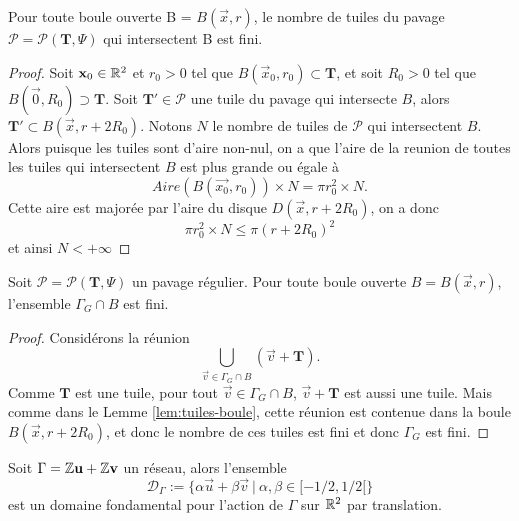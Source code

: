 \begin{lemma}
	\label{lem:tuiles-boule}
	Pour toute boule ouverte B = $B(\vec{x}, r)$, le nombre de tuiles
	du pavage $\mathcal{P} = \mathcal{P}(\mathbf{T}, \Psi)$ qui intersectent B est fini.
\end{lemma}
\begin{proof}
	Soit $\mathbf{x}_0 \in \mathbb{R}^2$ et $r_0 > 0$ tel que
	$B(\vec{x}_0, r_0) \subset \mathbf{T}$, et
	soit $R_0 > 0$ tel que $B(\vec{0}, R_0) \supset \mathbf{T}$.
	Soit $\mathbf{T}' \in \mathcal{P}$ une tuile du pavage qui intersecte $B$,
	alors $\mathbf{T}' \subset B(\vec{x}, r + 2R_0)$.
	Notons $N$ le nombre de tuiles de $\mathcal{P}$ qui intersectent $B$.
	Alors puisque les tuiles sont d'aire non-nul, on a que
	l'aire de la reunion de toutes les tuiles qui intersectent $B$
	est plus grande ou égale à
	\begin{equation*}
		Aire(B(\vec{x_0}, r_0)) \times N = \pi r_0^2 \times N.
	\end{equation*}
	Cette aire est majorée par l'aire du disque $D(\vec{x}, r + 2R_0)$,
	on a donc
	\begin{equation*}
		\pi r_0^2 \times N \leq \pi(r + 2R_0)^2
	\end{equation*}
	et ainsi $N < +\infty$
\end{proof}

\begin{lemma}
	\label{lem:translations-boule}
	Soit $\mathcal{P} = \mathcal{P}(\mathbf{T}, \Psi)$ un pavage régulier.
	Pour toute boule ouverte $B = B(\vec{x}, r)$, l'ensemble
	$\Gamma_G \cap B$ est fini.
\end{lemma}
\begin{proof}
	Considérons la réunion
	\begin{equation*}
		\bigcup_{\vec{v} \in \Gamma_G \cap B} (\vec{v} + \mathbf{T}).
	\end{equation*}
	Comme $\mathbf{T}$ est une tuile, pour tout $\vec{v} \in \Gamma_G \cap B$,
	$\vec{v} + \mathbf{T}$ est aussi une tuile.
	Mais comme dans le Lemme \ref{lem:tuiles-boule}, cette réunion est
	contenue dans la boule ${B(\vec{x}, r + 2R_0)}$, et donc le nombre de
	ces tuiles est fini et donc $\Gamma_G$ est fini.
\end{proof}

\begin{lemma}
	\label{lem:reseau-domaine-fondamental}
	Soit $\Gamma = \mathbb{Z}\mathbf{u} + \mathbb{Z}\mathbf{v}$ un réseau, alors l'ensemble
	\begin{equation*}
		\mathcal{D}_\Gamma :=
		\{\alpha\vec{u} + \beta\vec{v}\ |\ \alpha, \beta \in [-1/2, 1/2[\}
	\end{equation*}
	est un domaine fondamental pour l'action de $\Gamma$ sur $\mathbb{R}^2$ par
	translation.
\end{lemma}

